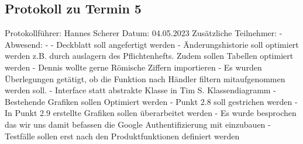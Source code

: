\subsection{Protokoll zu Termin 5}
Protokollführer: Hannes Scherer \newline
Datum: 04.05.2023 \newline
Zusätzliche Teilnehmer: - \newline
Abwesend: - \newline \newline
  - Deckblatt soll angefertigt werden \newline
  - Änderungshistorie soll optimiert werden z.B. durch auslagern des Pflichtenhefts. Zudem sollen Tabellen optimiert werden \newline
  - Dennis wollte gerne Römische Ziffern importieren \newline
  - Es wurden Überlegungen getätigt, ob die Funktion nach Händler filtern mitaufgenommen werden soll. \newline
  - Interface statt abstrakte Klasse in Tim S. Klassendiagramm \newline
  - Bestehende Grafiken sollen Optimiert werden \newline
  - Punkt 2.8 soll gestrichen werden \newline
  - In Punkt 2.9 erstellte Grafiken sollen überarbeitet werden \newline
  - Es wurde besprochen das wir uns damit befassen die Google Authentifizierung mit einzubauen \newline
  - Testfälle sollen erst nach den Produktfunktionen definiert werden \newline

\newpage

